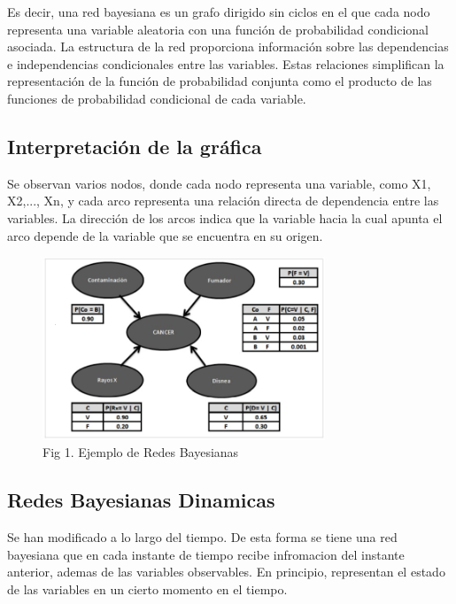 \documentclass[
  letterpaper,
  DIV=11,
  numbers=noendperiod]{scrartcl}
\begin{document}
Es decir, una red bayesiana es un grafo dirigido sin ciclos en el que
cada nodo representa una variable aleatoria con una función de
probabilidad condicional asociada. La estructura de la red proporciona
información sobre las dependencias e independencias condicionales entre
las variables. Estas relaciones simplifican la representación de la
función de probabilidad conjunta como el producto de las funciones de
probabilidad condicional de cada variable.

\hypertarget{interpretaciuxf3n-de-la-gruxe1fica}{%
\subsection{\texorpdfstring{\textbf{Interpretación de la
gráfica}}{Interpretación de la gráfica}}\label{interpretaciuxf3n-de-la-gruxe1fica}}

Se observan varios nodos, donde cada nodo representa una variable, como
X1, X2,..., Xn, y cada arco representa una relación directa de
dependencia entre las variables. La dirección de los arcos indica que la
variable hacia la cual apunta el arco depende de la variable que se
encuentra en su origen.

\begin{figure}

{\centering \includegraphics[width=3.32292in,height=\textheight]{images/WhatsApp Image 2023-05-26 at 21.19.34.jpeg}

}

\caption{Fig 1. Ejemplo de Redes Bayesianas}

\end{figure}

\hypertarget{redes-bayesianas-dinamicas}{%
\subsection{Redes Bayesianas
Dinamicas}\label{redes-bayesianas-dinamicas}}

Se han modificado a lo largo del tiempo. De esta forma se tiene una red
bayesiana que en cada instante de tiempo recibe infromacion del instante
anterior, ademas de las variables observables. En principio, representan
el estado de las variables en un cierto momento en el tiempo.
\end{document}
